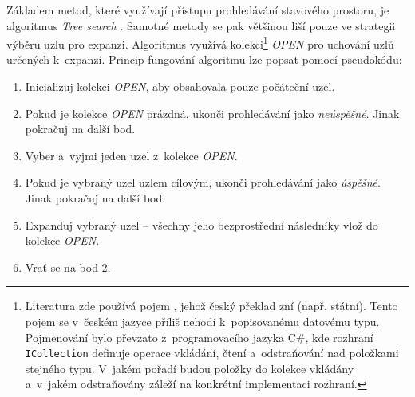 Základem metod, které využívají přístupu prohledávání stavového prostoru, je algoritmus \emph{Tree search} \cite{AI_Russel_Norvig}. Samotné metody se pak většinou liší pouze ve strategii výběru uzlu pro expanzi. Algoritmus využívá kolekci\footnote{Literatura \cite{AI_Russel_Norvig} zde používá pojem , jehož český překlad zní  (např. státní). Tento pojem se v~českém jazyce příliš nehodí k~popisovanému datovému typu. Pojmenování  bylo převzato z~programovacího jazyka C\#, kde rozhraní \texttt{ICollection} definuje operace vkládání, čtení a~odstraňování nad položkami stejného typu. V~jakém pořadí budou položky do kolekce vkládány a~v~jakém odstraňovány záleží na konkrétní implementaci rozhraní.} \emph{OPEN} pro uchování uzlů určených k~expanzi. Princip fungování algoritmu lze popsat pomocí pseudokódu:
\begin{enumerate}
    \item Inicializuj kolekci \emph{OPEN}, aby obsahovala pouze počáteční uzel.
    \item Pokud je kolekce \emph{OPEN} prázdná, ukonči prohledávání jako \emph{neúspěšné}. Jinak pokračuj na další bod.
    \item Vyber a~vyjmi jeden uzel z~kolekce \emph{OPEN}.
    \item Pokud je vybraný uzel uzlem cílovým, ukonči prohledávání jako \emph{úspěšné}. Jinak pokračuj na další bod.
    \item Expanduj vybraný uzel -- všechny jeho bezprostřední následníky vlož do kolekce \emph{OPEN}.
    \item Vrať se na bod 2.
\end{enumerate}

